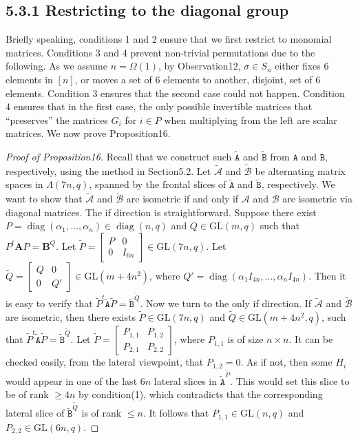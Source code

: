 \documentclass[10pt,a4paper]{article}
\begin{document}
\subsection*{5.3.1 Restricting to the diagonal group}
Briefly speaking, conditions 1 and 2 ensure that we first restrict to monomial matrices. Conditions 3 and 4 prevent non-trivial permutations due to the following. As we assume $n=\Omega(1)$, by Observation12, $\sigma\in S_n$ either fixes 6 elements in $[n]$, or moves a set of 6 elements to another, disjoint, set of 6 elements. Condition 3 ensures that the second case could not happen. Condition 4 ensures that in the first case, the only possible invertible matrices that ``preserves'' the matrices $G_i$ for $i\in P$ when multiplying from the left are scalar matrices.
We now prove Proposition16.
\begin{proof}[Proof of Proposition16]
Recall that we construct such $\widetilde{\mathtt A}$ and $\widetilde{\mathtt B}$ from $\mathtt A$ and $\mathtt B$, respectively, using the method in Section5.2. Let $\widetilde{\mathcal A}$ and $\widetilde{\mathcal B}$ be alternating matrix spaces in $\Lambda(7n,q)$, spanned by the frontal slices of $\widetilde{\mathtt A}$ and $\widetilde{\mathtt B}$, respectively.
We want to show that $\widetilde{\mathcal A}$ and $\widetilde{\mathcal B}$ are isometric if and only if $\mathcal A$ and $\mathcal B$ are isometric via diagonal matrices. The if direction is straightforward. Suppose there exist $P=\operatorname{diag}(\alpha_1,\ldots,\alpha_n)\in\operatorname{diag}(n,q)$ and $Q\in\mathrm{GL}(m,q)$ such that $P^t\mathbf A P=\mathbf B^Q$. Let $\widetilde P=\begin{bmatrix}P&0\\0&I_{6n}\end{bmatrix}\in\mathrm{GL}(7n,q)$. Let $\widetilde Q=\begin{bmatrix}Q&0\\0&Q'\end{bmatrix}\in\mathrm{GL}(m+4n^2)$, where $Q'=\operatorname{diag}(\alpha_1I_{4n},\ldots,\alpha_nI_{4n})$. Then it is easy to verify that $\widetilde P^t\widetilde{\mathtt A}\widetilde P=\widetilde{\mathtt B}^{\widetilde Q}$.
Now we turn to the only if direction. If $\widetilde{\mathcal A}$ and $\widetilde{\mathcal B}$ are isometric, then there exists $\widetilde P\in\mathrm{GL}(7n,q)$ and $\widetilde Q\in\mathrm{GL}(m+4n^2,q)$, such that $\widetilde P^t\widetilde{\mathtt A}\widetilde P=\widetilde{\mathtt B}^{\widetilde Q}$. Let $\widetilde P=\begin{bmatrix}P_{1,1}&P_{1,2}\\P_{2,1}&P_{2,2}\end{bmatrix}$, where $P_{1,1}$ is of size $n\times n$. It can be checked easily, from the lateral viewpoint, that $P_{1,2}=0$. As if not, then some $H_i$ would appear in one of the last $6n$ lateral slices in $\widetilde{\mathtt A}^{\widetilde P}$. This would set this slice to be of rank $\ge4n$ by condition(1), which contradicts that the corresponding lateral slice of $\widetilde{\mathtt B}^{\widetilde Q}$ is of rank $\le n$. It follows that $P_{1,1}\in\mathrm{GL}(n,q)$ and $P_{2,2}\in\mathrm{GL}(6n,q)$.

\end{proof}
\end{document}
